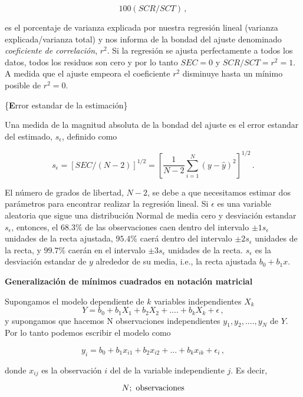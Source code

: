\documentclass[
]{agujournal2019}
\begin{document}
\[100(SCR/SCT)\,,\]

es el porcentaje de varianza explicada por nuestra regresión lineal
(varianza explicada/varianza total) y nos informa de la bondad del
ajuste denominado \emph{coeficiente de correlación}, \(r^2\). Si la
regresión se ajusta perfectamente a todos los datos, todos los residuos
son cero y por lo tanto \(SEC=0\) y \(SCR/SCT=r^2=1\). A medida que el
ajuste empeora el coeficiente \(r^2\) disminuye hasta un mínimo posible
de \(r^2=0\).

\vspace{0.5cm}

\{\noindent \textbf Error estandar de la estimación\}

\noindent Una medida de la magnitud absoluta de la bondad del ajuste es
el error estandar del estimado, \(s_{\epsilon}\), definido como

\[s_{\epsilon}=[SEC/(N-2)]^{1/2}=\left[ \frac{1}{N-2}\sum\limits^N_{i=1} (y-\hat{y})^2\right]^{1/2}\,.\]

El número de grados de libertad, \(N-2\), se debe a que necesitamos
estimar dos parámetros para encontrar realizar la regresión lineal. Si
\({\epsilon}\) es una variable aleatoria que sigue una distribución
Normal de media cero y desviación estandar \(s_{\epsilon}\), entonces,
el \(68.3\%\) de las observaciones caen dentro del intervalo
\(\pm 1s_{\epsilon}\) unidades de la recta ajustada, \(95.4\%\) caerá
dentro del intervalo \(\pm 2 s_{\epsilon}\) unidades de la recta, y
\(99.7\%\) caerán en el intervalo \(\pm 3 s_{\epsilon}\) unidades de la
recta. \(s_{\epsilon}\) es la desviación estandar de \(y\) alrededor de
su media, i.e., la recta ajustada \(b_0 + b_1 x\).

\vspace{0.5cm}

\textbf{Generalización de mínimos cuadrados en notación matricial}

\noindent Supongamos el modelo dependiente de \(k\) variables
independientes \(X_k\)
\[Y=b_0 + b_1 X_1 + b_2 X_2 + .... + b_k X_k + \epsilon\,,\] y
supongamos que hacemos N observaciones independientes
\(y_1, y_2,....,y_N\) de \(Y\). Por lo tanto podemos escribir el modelo
como

\[y_i=b_0 + b_1 x_{i1} + b_2 x_{i2} + ... + b_k x_{ik} + \epsilon_i\,,\]

donde \(x_{ij}\) es la observación \(i\) del de la variable
independiente \(j\). Es decir,

\[N;\,\,{\rm observaciones}\]
\end{document}
